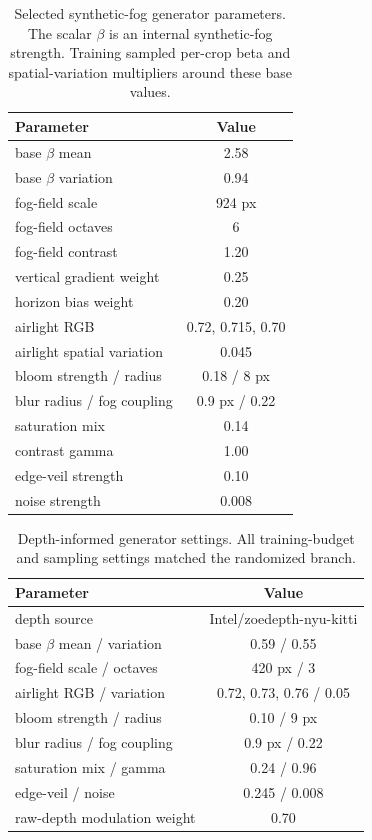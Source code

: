 \documentclass[9pt]{osa-supplemental-document}
\begin{document}
\begin{table}[htbp]
\centering
\small
\caption{Selected synthetic-fog generator parameters. The scalar $\beta$ is an internal synthetic-fog strength. Training sampled per-crop beta and spatial-variation multipliers around these base values.}
\label{tabS:spatial_synth_params}
\begin{tabular}{lc}
\toprule
\textbf{Parameter} & \textbf{Value} \\
\midrule
base $\beta$ mean & 2.58 \\
base $\beta$ variation & 0.94 \\
fog-field scale & 924 px \\
fog-field octaves & 6 \\
fog-field contrast & 1.20 \\
vertical gradient weight & 0.25 \\
horizon bias weight & 0.20 \\
airlight RGB & 0.72, 0.715, 0.70 \\
airlight spatial variation & 0.045 \\
bloom strength / radius & 0.18 / 8 px \\
blur radius / fog coupling & 0.9 px / 0.22 \\
saturation mix & 0.14 \\
contrast gamma & 1.00 \\
edge-veil strength & 0.10 \\
noise strength & 0.008 \\
\bottomrule
\end{tabular}
\end{table}

\begin{table}[htbp]
\centering
\small
\caption{Depth-informed generator settings. All training-budget and
sampling settings matched the randomized branch.}
\label{tabS:depth_synth_params}
\begin{tabular}{lc}
\toprule
\textbf{Parameter} & \textbf{Value} \\
\midrule
depth source & Intel/zoedepth-nyu-kitti \\
base $\beta$ mean / variation & 0.59 / 0.55 \\
fog-field scale / octaves & 420 px / 3 \\
airlight RGB / variation & 0.72, 0.73, 0.76 / 0.05 \\
bloom strength / radius & 0.10 / 9 px \\
blur radius / fog coupling & 0.9 px / 0.22 \\
saturation mix / gamma & 0.24 / 0.96 \\
edge-veil / noise & 0.245 / 0.008 \\
raw-depth modulation weight & 0.70 \\
\bottomrule
\end{tabular}
\end{table}
\end{document}
